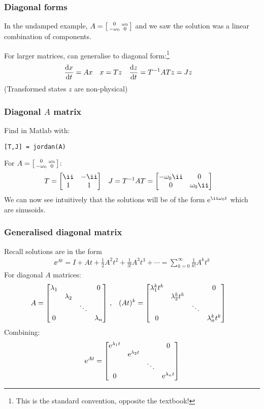 \documentclass{beamer-control}
\begin{document}

\begin{frame}
\frametitle{Diagonal forms}
In the undamped example, $A = \left[\begin{smallmatrix} 0 & \omega_0\\ -\omega_0 & 0\end{smallmatrix}\right]$ and we saw the solution was a linear combination of components.

\bigskip
For larger matrices, can generalise to \alert{diagonal form}:\footnote{\alert{This is the standard convention, opposite the textbook!}}
\begin{align}
\frac{\mathrm{d} x}{\mathrm{d} t} &= Ax & x &= Tz & \frac{\mathrm{d} z}{\mathrm{d} t} &= T^{-1}ATz = Jz
\end{align}
(Transformed states $z$ are non-physical)

\end{frame}

\begin{frame}[fragile]
\frametitle{Diagonal $A$ matrix}
Find in Matlab with:
\begin{lstlisting}[style=Matlab-editor]
[T,J] = jordan(A)
\end{lstlisting}
For $A = \left[\begin{smallmatrix} 0 & \omega_0\\ -\omega_0 & 0\end{smallmatrix}\right]$:
\begin{align}
T &= \Matr{ \ii & -\ii \\ 1 & 1  } & J &= T^{-1}AT = \Matr{ -\ww_0 \ii & 0 \\ 0 & \ww_0 \ii}
\end{align}
We can now see intuitively that the solutions will be of the form $\ee^{\ii \ww_0 t}$ which are sinusoids.
\end{frame}

\begin{frame}
\frametitle{Generalised diagonal matrix}
Recall solutions are in the form
\begin{align}
\ee^{At} = I + At + \tfrac12 A^2t^2 + \tfrac{1}{3!}A^3t^3 + \cdots = \sum_{k=0}^{\infty} \tfrac{1}{k!}A^kt^k
\end{align}
For diagonal $A$ matrices:
\begin{align}
A &= \begin{bmatrix} \lambda_1 &  &  & 0 \\  & \lambda_2 &  &  \\  &  & \ddots &  \\ 0 &  &  & \lambda_n \end{bmatrix} \,, &
(At)^k &= \begin{bmatrix} \lambda_1^kt^k &  &  & 0 \\  & \lambda_2^kt^k &  &  \\  &  & \ddots &  \\ 0 &  &  & \lambda_n^kt^k \end{bmatrix}
\end{align}
Combining:
\begin{align}\label{eq:diagform}
\mathrm{e}^{At} = \begin{bmatrix} \mathrm{e}^{\lambda_1 t} &  &  & 0 \\  & \mathrm{e}^{\lambda_2 t} &  &  \\  &  & \ddots &  \\ 0 &  &  & \mathrm{e}^{\lambda_n t} \end{bmatrix}
\end{align}

\end{frame}
\end{document}
